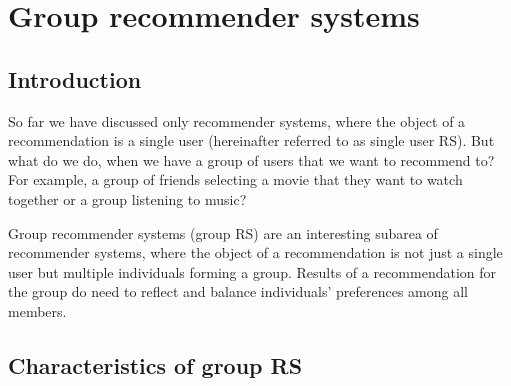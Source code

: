 
\section{Group recommender systems} \label{sec:01_group_rec_sys}
\subsection{Introduction}\label{subsec:01_group_rec_sys.introduction}
So far we have discussed only recommender systems, where the object of a recommendation is a single user (hereinafter referred to as single user RS). But what do we do, when we have a group of users that we want to recommend to? For example, a group of friends selecting a movie that they want to watch together or a group listening to music? %

Group recommender systems (group RS) are an interesting subarea of recommender systems, where the object of a recommendation is not just a single user but multiple individuals forming a group. Results of a recommendation for the group do need to reflect and balance individuals' preferences among all members.


\subsection{Characteristics of group RS}




